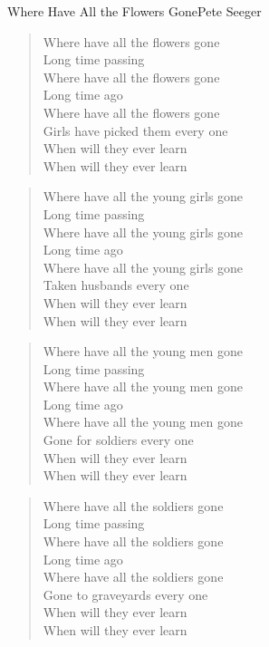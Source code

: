 \begin{song}{Where Have All the Flowers Gone}{Pete Seeger}
	
	\begin{verse}
		Where have all the flowers gone \\
		Long time passing \\
		Where have all the flowers gone \\
		Long time ago \\
		Where have all the flowers gone \\
		Girls have picked them every one \\
		 When will they ever learn \\
		 When will they ever learn \\
	\end{verse}
	
	\begin{verse}
		Where have all the young girls gone \\
		Long time passing \\
		Where have all the young girls gone \\
		Long time ago \\
		Where have all the young girls gone \\
		Taken husbands every one \\
		When will they ever learn \\
		When will they ever learn \\
	\end{verse}
	
	\begin{verse}
		Where have all the young men gone \\
		Long time passing \\
		Where have all the young men gone \\
		Long time ago \\
		Where have all the young men gone \\
		Gone for soldiers every one \\
		When will they ever learn \\
		When will they ever learn \\
	\end{verse}
	
	\begin{verse}
		Where have all the soldiers gone \\
		Long time passing \\
		Where have all the soldiers gone \\
		Long time ago \\
		Where have all the soldiers gone \\
		Gone to graveyards every one \\
		When will they ever learn \\
		When will they ever learn \\
	\end{verse}
	

\end{song}
